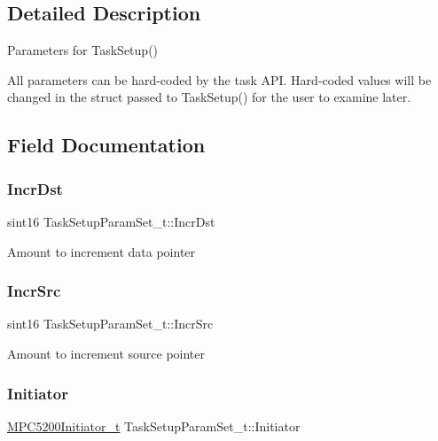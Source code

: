 \subsection{Detailed Description}
Parameters for Task\+Setup() 

All parameters can be hard-\/coded by the task A\+PI. Hard-\/coded values will be changed in the struct passed to Task\+Setup() for the user to examine later. 

\subsection{Field Documentation}
\mbox{\label{structTaskSetupParamSet__t_ae232b3e1ed253baca710adf4c6c17c5d}} 
\subsubsection{\texorpdfstring{IncrDst}{IncrDst}}
{\footnotesize\ttfamily sint16 Task\+Setup\+Param\+Set\+\_\+t\+::\+Incr\+Dst}

Amount to increment data pointer \mbox{\label{structTaskSetupParamSet__t_a93414fca91a07ca4ec08d9b809ea824b}} 
\subsubsection{\texorpdfstring{IncrSrc}{IncrSrc}}
{\footnotesize\ttfamily sint16 Task\+Setup\+Param\+Set\+\_\+t\+::\+Incr\+Src}

Amount to increment source pointer \mbox{\label{structTaskSetupParamSet__t_a10ca02859f29ab8facc532e17ac57b1c}} 
\subsubsection{\texorpdfstring{Initiator}{Initiator}}
{\footnotesize\ttfamily \mbox{\hyperlink{bestcomm__api_8h_a6590b0d43c4d03b9deeb566a946cc4a1}{M\+P\+C5200\+Initiator\+\_\+t}} Task\+Setup\+Param\+Set\+\_\+t\+::\+Initiator}

